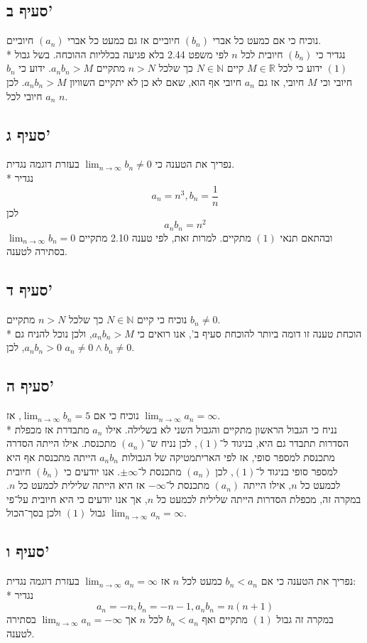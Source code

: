 \documentclass[a4paper]{article}
\def\NN{\mathbb{N}}
\def\RR{\mathbb{R}}
\begin{document}
\subsection{סעיף ב'}
נוכיח כי אם כמעט כל אברי $(b_n)$ חיוביים אז גם כמעט כל אברי $(a_n)$ חיוביים. \\*
נגדיר כי $(b_n)$ חיובית לכל $n$ לפי משפט 2.44 בלא פגיעה בכלליות ההוכחה.
בשל גבול $(1)$ ידוע כי לכל $M \in \RR$ קיים $N \in \NN$ כך שלכל $n > N$ מתקיים $a_n b_n > M$.
ידוע כי $b_n$ חיובי וכי $M$ חיובי, אז גם $a_n$ חיובי אף הוא, שאם לא כן לא יתקיים השוויון $a_n b_n > M$.
לכן $a_n$ חיובי לכל $n$.

\subsection{סעיף ג'}
נפריך את הטענה כי $\lim_{n \to \infty} b_n \ne 0$ בעזרת דוגמה נגדית. \\*
נגדיר
\[
	a_n = n^3,
	b_n = \frac{1}{n}
\]
לכן
\[
	a_n b_n = n^2
\]
ובהתאם תנאי $(1)$ מתקיים. למרות זאת, לפי טענה 2.10 מתקיים $\lim_{n \to \infty} b_n = 0$ בסתירה לטענה.

\subsection{סעיף ד'}
נוכיח כי קיים $N \in \NN$ כך שלכל $n > N$ מתקיים $b_n \ne 0$. \\*
הוכחת טענה זו דומה ביותר להוכחת סעיף ב', אנו רואים כי $a_n b_n > M$, ולכן נוכל להניח גם $a_n b_n > 0$, לכן $a_n \ne 0 \land b_n \ne 0$.

\subsection{סעיף ה'}
נוכיח כי אם $\lim_{n \to \infty} b_n = 5$, אז $\lim_{n \to \infty} a_n = \infty$. \\*
נניח כי הגבול הראשון מתקיים והגבול השני לא בשלילה.
אילו $a_n$ מתבדרת אז מכפלת הסדרות תתבדר גם היא, בניגוד ל־$(1)$, לכן נניח ש־$(a_n)$ מתכנסת.
אילו הייתה הסדרה מתכנסת למספר סופי, אז לפי האריתמטיקה של הגבולות $a_n b_n$ הייתה מתכנסת אף היא למספר סופי בניגוד ל־$(1)$,
לכן $(a_n)$ מתכנסת ל־$\pm \infty$. אנו יודעים כי $(b_n)$ חיובית לכמעט כל $n$, אילו הייתה $(a_n)$ מתכנסת ל־$-\infty$ אז היא הייתה שלילית לכמעט כל $n$.
במקרה זה, מכפלת הסדרות הייתה שלילית לכמעט כל $n$, אך אנו יודעים כי היא חיובית על־פי גבול $(1)$ ולכן בסך־הכול $\lim_{n \to \infty} a_n = \infty$.

\subsection{סעיף ו'}
נפריך את הטענה כי אם $b_n < a_n$ כמעט לכל $n$ אז $\lim_{n \to \infty} a_n = \infty$ בעזרת דוגמה נגדית: \\*
נגדיר
\[
	a_n = -n, b_n = -n - 1, a_n b_n = n (n + 1)
\]
במקרה זה גבול $(1)$ מתקיים ואף $b_n < a_n$ לכל $n$ אך $\lim_{n \to \infty} a_n = -\infty$ בסתירה לטענה.
\end{document}
